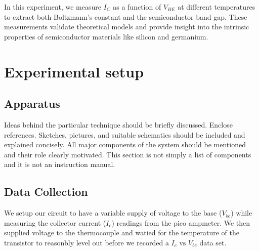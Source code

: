 \documentclass[12pt,letterpaper,twocolumn]{article}
\begin{document}
In this experiment, we measure \( I_C \) as a function of \( V_{BE} \) at different temperatures to extract both Boltzmann’s constant and the semiconductor band gap. These measurements validate theoretical models and provide insight into the intrinsic properties of semiconductor materials like silicon and germanium.



\section{Experimental setup}


\subsection{Apparatus}

Ideas behind the particular technique should be briefly
discussed. Enclose references. Sketches, pictures, and
suitable schematics should be included and explained
concisely. All major components of the system should be
mentioned and their role clearly motivated. This section
is not simply a list of components and it is not an
instruction manual. 



\subsection{Data Collection}
We setup our circuit to have a variable supply of voltage to the base ($V_{be}$) while measuring the collector current ($I_c$) readings from the pico ampmeter.
We then supplied voltage to the thermocouple and watied for the temperature of the transistor to reasonbly level out before we recorded a $I_c \text{ vs } V_{be}$ data set.


\end{document}
